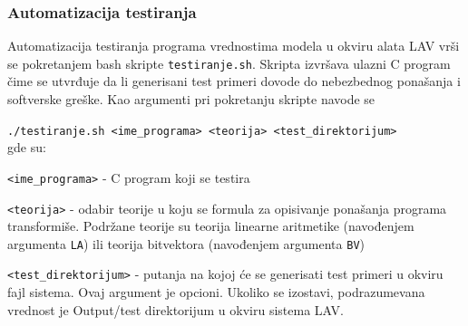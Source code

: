 \documentclass[12pt,oneside]{memoir}
\begin{document}
\subsubsection{Automatizacija testiranja}
Automatizacija testiranja programa vrednostima modela u okviru alata LAV vrši se pokretanjem bash skripte \texttt{testiranje.sh}. Skripta izvršava ulazni C program čime se utvrđuje da li generisani test primeri dovode do nebezbednog ponašanja i softverske greške.
Kao argumenti pri pokretanju skripte navode se 
\par
\texttt{./testiranje.sh <ime\_programa> <teorija> <test\_direktorijum>}
\\ gde su:
\begin{description}
  \item \texttt{<ime\_programa>} - C program koji se testira
  \item \texttt{<teorija>} - odabir teorije u koju se formula za opisivanje ponašanja programa transformiše. Podržane teorije su teorija linearne aritmetike (navođenjem argumenta \texttt{LA}) ili teorija bitvektora (navođenjem argumenta \texttt{BV})
  \item \texttt{<test\_direktorijum>} - putanja na kojoj će se generisati test primeri u okviru fajl sistema. Ovaj argument je opcioni. Ukoliko se izostavi, podrazumevana vrednost je Output/test direktorijum u okviru sistema LAV.
\end{description}
 
\end{document}
